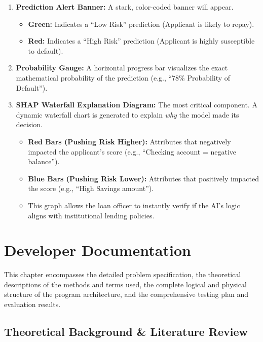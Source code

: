 \begin{enumerate}
\def\labelenumi{\arabic{enumi}.}
\tightlist
\item
  \textbf{Prediction Alert Banner:} A stark, color-coded banner will
  appear.

  \begin{itemize}
  \tightlist
  \item
    \textbf{Green:} Indicates a ``Low Risk'' prediction (Applicant is
    likely to repay).
  \item
    \textbf{Red:} Indicates a ``High Risk'' prediction (Applicant is
    highly susceptible to default).
  \end{itemize}
\item
  \textbf{Probability Gauge:} A horizontal progress bar visualizes the
  exact mathematical probability of the prediction (e.g., ``78\%
  Probability of Default'').
\item
  \textbf{SHAP Waterfall Explanation Diagram:} The most critical
  component. A dynamic waterfall chart is generated to explain
  \emph{why} the model made its decision.

  \begin{itemize}
  \tightlist
  \item
    \textbf{Red Bars (Pushing Risk Higher):} Attributes that negatively
    impacted the applicant's score (e.g., ``Checking account = negative
    balance'').
  \item
    \textbf{Blue Bars (Pushing Risk Lower):} Attributes that positively
    impacted the score (e.g., ``High Savings amount'').
  \item
    This graph allows the loan officer to instantly verify if the AI's
    logic aligns with institutional lending policies.
  \end{itemize}
\end{enumerate}

\hypertarget{developer-documentation}{%
\chapter{Developer Documentation}\label{developer-documentation}}

This chapter encompasses the detailed problem specification, the
theoretical descriptions of the methods and terms used, the complete
logical and physical structure of the program architecture, and the
comprehensive testing plan and evaluation results.

\hypertarget{theoretical-background-literature-review}{%
\section{Theoretical Background \& Literature
Review}\label{theoretical-background-literature-review}}

